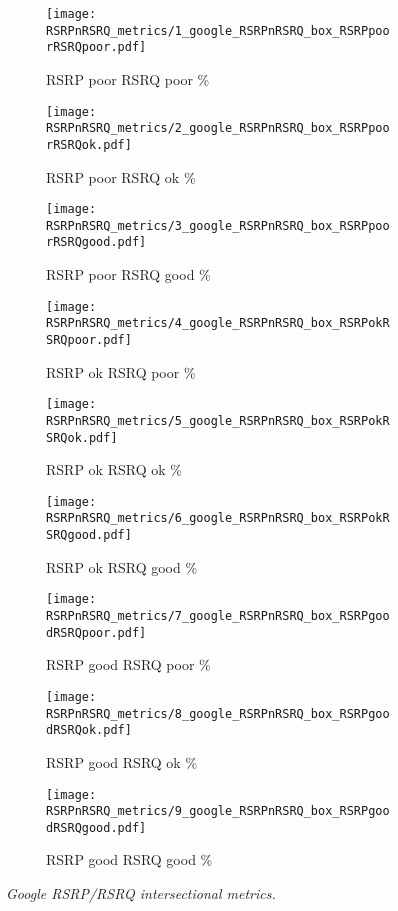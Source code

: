 \begin{figure}
\centering
	\begin{subfigure}[b]{0.3	\linewidth}
		\texttt{[image: RSRPnRSRQ\_metrics/1\_google\_RSRPnRSRQ\_box\_RSRPpoorRSRQpoor.pdf]}
		\caption{\tiny{RSRP poor RSRQ poor \%}}
	\end{subfigure}
	\begin{subfigure}[b]{0.3	\linewidth}
		\texttt{[image: RSRPnRSRQ\_metrics/2\_google\_RSRPnRSRQ\_box\_RSRPpoorRSRQok.pdf]}
		\caption{\tiny{RSRP poor RSRQ ok \%}}
	\end{subfigure}
	\begin{subfigure}[b]{0.3	\linewidth}
		\texttt{[image: RSRPnRSRQ\_metrics/3\_google\_RSRPnRSRQ\_box\_RSRPpoorRSRQgood.pdf]}
		\caption{\tiny{RSRP poor RSRQ good \%}}
	\end{subfigure}
	\begin{subfigure}[b]{0.3	\linewidth}
		\texttt{[image: RSRPnRSRQ\_metrics/4\_google\_RSRPnRSRQ\_box\_RSRPokRSRQpoor.pdf]}
		\caption{\tiny{RSRP ok RSRQ poor \%}}
	\end{subfigure}
	\begin{subfigure}[b]{0.3	\linewidth}
		\texttt{[image: RSRPnRSRQ\_metrics/5\_google\_RSRPnRSRQ\_box\_RSRPokRSRQok.pdf]}
		\caption{\tiny{RSRP ok RSRQ ok \%}}
	\end{subfigure}
	\begin{subfigure}[b]{0.3	\linewidth}
		\texttt{[image: RSRPnRSRQ\_metrics/6\_google\_RSRPnRSRQ\_box\_RSRPokRSRQgood.pdf]}
		\caption{\tiny{RSRP ok RSRQ good \%}}
	\end{subfigure}
	\begin{subfigure}[b]{0.3	\linewidth}
		\texttt{[image: RSRPnRSRQ\_metrics/7\_google\_RSRPnRSRQ\_box\_RSRPgoodRSRQpoor.pdf]}
		\caption{\tiny{RSRP good RSRQ poor \%}}
	\end{subfigure}
	\begin{subfigure}[b]{0.3	\linewidth}
		\texttt{[image: RSRPnRSRQ\_metrics/8\_google\_RSRPnRSRQ\_box\_RSRPgoodRSRQok.pdf]}
		\caption{\tiny{RSRP good RSRQ ok \%}}
	\end{subfigure}
	\begin{subfigure}[b]{0.3	\linewidth}
		\texttt{[image: RSRPnRSRQ\_metrics/9\_google\_RSRPnRSRQ\_box\_RSRPgoodRSRQgood.pdf]}
		\caption{\tiny{RSRP good RSRQ good \%}}
	\end{subfigure}
\caption{\textit{Google RSRP/RSRQ intersectional metrics.}}
\label{fig:google_RSRPnRSRQ_metrics}
\end{figure}

